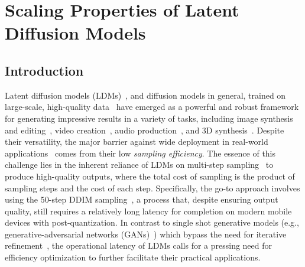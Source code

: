 \chapter{Scaling Properties of Latent Diffusion Models} \label{chap:chap-2}

\section{Introduction}
Latent diffusion models (LDMs)~\cite{rombach2022high}, and diffusion models in general, trained on large-scale, high-quality data~\cite{lin2014microsoft, schuhmann2022laion} have emerged as a powerful and robust framework for generating impressive results in a variety of tasks, including image synthesis and editing~\cite{rombach2022high, podell2023sdxl, delbracio2023inversion, ren2023multiscale, qi2023tip}, video creation~\cite{mei2023vidm, mei2023t1, wu2023tune, singer2022make}, audio production~\cite{liu2023audioldm}, and 3D synthesis~\cite{lin2023magic3d, liu2023zero}.
%
Despite their versatility, the major barrier against wide deployment in real-world applications~\cite{du2023exploring, choi2023squeezing} comes from their low \emph{sampling efficiency}.
%
The essence of this challenge lies in the inherent reliance of LDMs on multi-step sampling~\cite{song2020score, ho2020denoising} to produce high-quality outputs, where the total cost of sampling is the product of sampling steps and the cost of each step.
%
Specifically, the go-to approach involves using the 50-step DDIM sampling~\cite{song2020denoising, rombach2022high}, a process that, despite ensuring output quality, still requires a relatively long latency for completion on modern mobile devices with post-quantization.
%
In contrast to single shot generative models (e.g., generative-adversarial networks (GANs)~\cite{goodfellow2020generative}) which bypass the need for iterative refinement~\cite{goodfellow2020generative,karras2019style}, the operational latency of LDMs calls for a pressing need for efficiency optimization to further facilitate their practical applications.

